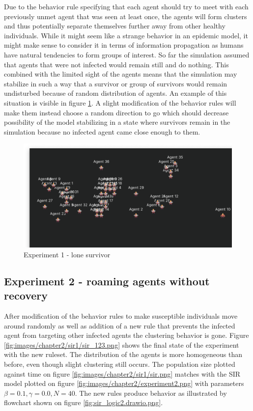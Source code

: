 Due to the behavior rule specifying that each agent should try to meet with each previously unmet agent that was seen at least once, the agents will form clusters and thus potentially separate themselves further away from other healthy individuals.
While it might seem like a strange behavior in an epidemic model, it might make sense to consider it in terms of information propagation as humans have natural tendencies to form groups of interest.
So far the simulation assumed that agents that were not infected would remain still and do nothing.
This combined with the limited sight of the agents means that the simulation may stabilize in such a way that a survivor or group of survivors would remain undisturbed because of random distribution of agents.
An example of this situation is visible in figure \ref{fig:images/chapter2/sir0/sir_255.png}.
A slight modification of the behavior rules will make them instead choose a random direction to go which should decrease possibility of the model stabilizing in a state where survivors remain in the simulation because no infected agent came close enough to them.

\begin{figure}[H]
    \centering
    \includegraphics[width=1.0\textwidth]{images/chapter2/sir0/sir_255.png}
    \caption{Experiment 1 - lone survivor}\label{fig:images/chapter2/sir0/sir_255.png}
\end{figure}

\subsection{Experiment 2 - roaming agents without recovery}

After modification of the behavior rules to make susceptible individuals move around randomly as well as addition of a new rule that prevents the infected agent from targeting other infected agents the clustering behavior is gone.
Figure \ref{fig:images/chapter2/sir1/sir_123.png} shows the final state of the experiment with the new ruleset.
The distribution of the agents is more homogeneous than before, even though slight clustering still occurs.
The population size plotted against time on figure \ref{fig:images/chapter2/sir1/sir.png} matches with the SIR model plotted on figure \ref{fig:images/chapter2/experiment2.png} with parameters $\beta = 0.1, \gamma = 0.0, N = 40$.
The new rules produce behavior as illustrated by flowchart shown on figure \ref{fig:sir_logic2.drawio.png}.

